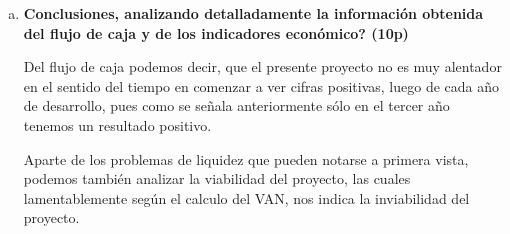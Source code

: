 \begin{enumerate}[(a)]
\begin{itemize}
        \end{itemize}

       \begin{center}
       \end{center}

       \begin{center}
       \end{center}

\newpage
    \item {\bf Conclusiones, analizando detalladamente la información obtenida del flujo de caja y de los indicadores económico? (10p)}


          Del flujo de caja podemos decir, que el presente proyecto no es muy alentador en el sentido del tiempo
          en comenzar a ver cifras positivas, luego de cada año de desarrollo, pues como se señala anteriormente
          sólo en el tercer año tenemos un resultado positivo.

          Aparte de los problemas de liquidez que pueden notarse a primera vista,
          podemos también analizar la viabilidad del proyecto, las cuales
          lamentablemente según el calculo del VAN, nos indica la inviabilidad del proyecto.


\end{enumerate}
